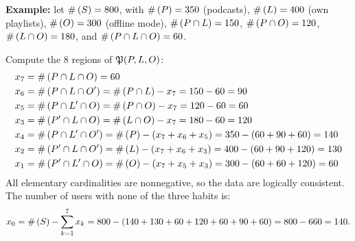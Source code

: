 \begin{solproblema}[prob:95d5458]
	\textbf{Example:} let $\#\left( S \right)=800$, with $\#\left( P \right)=350$ (podcasts), $\#\left( L \right)=400$ (own playlists), $\#\left( O \right)=300$ (offline mode), $\#\left( P \cap L \right)=150$, $\#\left( P \cap O \right)=120$, $\#\left( L \cap O \right)=180$, and $\#\left( P \cap L \cap O \right)=60$.

	Compute the 8 regions of $\mathfrak{P}(P,L,O)$:
	\begin{align}
		x_7 &= \#\left( P \cap L \cap O \right) = 60 \\
		x_6 &= \#\left( P \cap L \cap O' \right) = \#\left( P \cap L \right) - x_7 = 150-60 = 90 \\
		x_5 &= \#\left( P \cap L' \cap O \right) = \#\left( P \cap O \right) - x_7 = 120-60 = 60 \\
		x_3 &= \#\left( P' \cap L \cap O \right) = \#\left( L \cap O \right) - x_7 = 180-60 = 120 \\
		x_4 &= \#\left( P \cap L' \cap O' \right) = \#\left( P \right) - (x_7+x_6+x_5) = 350-(60+90+60) = 140 \\
		x_2 &= \#\left( P' \cap L \cap O' \right) = \#\left( L \right) - (x_7+x_6+x_3) = 400-(60+90+120) = 130 \\
		x_1 &= \#\left( P' \cap L' \cap O \right) = \#\left( O \right) - (x_7+x_5+x_3) = 300-(60+60+120) = 60
	\end{align}
	All elementary cardinalities are nonnegative, so the data are logically consistent. The number of users with none of the three habits is:
	\begin{align}
		x_0 = \#\left( S \right) - \sum_{k=1}^7 x_k = 800 - (140+130+60+120+60+90+60) = 800 - 660 = 140.
	\end{align}
\end{solproblema}
